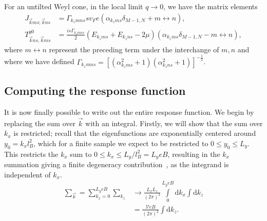 \begin{summary}
  For an untilted Weyl cone, in the local limit \( q\to 0 \), we have the matrix elements
  \begin{align}
    J_{\vec{k} ms; \vec{k} ns}&=
                                \Gamma_{k_z m n s}
                                sv_F e
                                \left(
                                \alpha_{k_z m s} \delta _{M-1, N}
                                + m\leftrightarrow n
                                \right),\\
    T^{y 0}_{\vec{k} ns, \vec{k}ms} &=
                                           \frac{is \Gamma_{k_z m n s}}{2}
                                           \left(E_{k_z m s} + E_{k_z n s}- 2\mu \right)
                                           \left(
                                           \alpha_{k_z m s} \delta_{M-1, N}
                                           -
                                           m\leftrightarrow n
                                           \right),
  \end{align}
where \( m \leftrightarrow n \) represent the preceding term under the interchange of \( m, n \) and where we have defined
$
\Gamma_{k_z m n s} =
\left[(\alpha_{k_zm s}^2 + 1) (\alpha_{k_z n s}^2 + 1) \right]^{-\frac{1}{2}}
$.
\end{summary}

\subsection{Computing the response function}
\label{sec:response_notilt}
It is now finally possible to write out the entire response function.
We begin by replacing the sum over \( \vec{k} \) with an integral.
Firstly, we will show that the sum over $k_x$ is restricted;
recall that the eigenfunctions are exponentially centered around $y_0 = k_x l_B^2$, which for a finite sample we expect to be restricted to $0 \leq y_0 \leq L_y$.
This restricts the $k_x$ sum to $0 \leq k_x \leq L_y / l_B^2 = L_ye B$, resulting in the $k_x$ summation giving a finite degeneracy contribution~\cites[Ch.~1.4.1]{tongGaugeTheoryLecture}{linderIntermediateQuantumMechanics2017}, as the integrand is independent of \( k_x \).
\begin{align}
  \sum\limits_{\vec{k}}^{} = \sum\limits_{k_x = 0}^{L_y eB } \sum\limits_{k_z}^{} &\to
                                                                                            \frac{L_xL_z}{(2\pi )^2} \int\limits_0^{L_y e B } \mathrm{d}k_x \int\mathrm{d}k_z \\
  &= \frac{\mathcal{V} e B}{(2 \pi)^2  } \int \mathrm{d}k_{z}.
\end{align}

